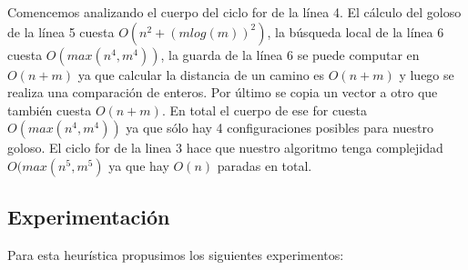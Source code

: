 Comencemos analizando el cuerpo del ciclo for de la l\'inea 4. El c\'alculo del goloso de la l\'inea 5 cuesta $O(n^2+(mlog(m))^2)$, la b\'usqueda local de la l\'inea 6 cuesta $O(max(n^4,m^4))$, la guarda de la l\'inea 6 se puede computar en $O(n+m)$ ya que calcular la distancia de un camino es $O(n+m)$ y luego se realiza una comparaci\'on de enteros. Por \'ultimo se copia un vector a otro que tambi\'en cuesta $O(n+m)$. En total el cuerpo de ese for cuesta $O(max(n^4,m^4))$ ya que s\'olo hay 4 configuraciones posibles para nuestro goloso. El ciclo for de la linea 3 hace que nuestro algoritmo tenga complejidad $O(max(n^5,m^5)$ ya que hay $O(n)$ paradas en total.

\subsection{Experimentaci\'on}

Para esta heur\'istica propusimos los siguientes experimentos:

